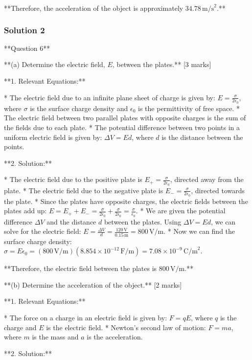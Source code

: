 \documentclass{article}
\begin{document}
**Therefore, the acceleration of the object is approximately $34.78 \, \text{m/s}^2$.**


\subsubsection{Solution 2}
**Question 6**

**(a) Determine the electric field, $E$, between the plates.** [3 marks]

**1. Relevant Equations:**

*   The electric field due to an infinite plane sheet of charge is given by:  $E = \frac{\sigma}{2\epsilon_0}$, where $\sigma$ is the surface charge density and $\epsilon_0$ is the permittivity of free space.
*   The electric field between two parallel plates with opposite charges is the sum of the fields due to each plate.
*   The potential difference between two points in a uniform electric field is given by: $\Delta V = Ed$, where $d$ is the distance between the points.

**2. Solution:**

*   The electric field due to the positive plate is $E_+ = \frac{\sigma}{2\epsilon_0}$, directed away from the plate.
*   The electric field due to the negative plate is $E_- = \frac{\sigma}{2\epsilon_0}$, directed towards the plate.
*   Since the plates have opposite charges, the electric fields between the plates add up: $E = E_+ + E_- = \frac{\sigma}{2\epsilon_0} + \frac{\sigma}{2\epsilon_0} = \frac{\sigma}{\epsilon_0}$.
*   We are given the potential difference $\Delta V$ and the distance $d$ between the plates.  Using $\Delta V = Ed$, we can solve for the electric field: 
    $E = \frac{\Delta V}{d} = \frac{120 \, \text{V}}{0.15 \, \text{m}} = 800 \, \text{V/m}$.
*   Now we can find the surface charge density: $\sigma = E \epsilon_0 = (800 \, \text{V/m})(8.854 \times 10^{-12} \, \text{F/m}) = 7.08 \times 10^{-9} \, \text{C/m}^2$.

**Therefore, the electric field between the plates is $800 \, \text{V/m}$.**

**(b) Determine the acceleration of the object.** [2 marks]

**1. Relevant Equations:**

*   The force on a charge in an electric field is given by: $F = qE$, where $q$ is the charge and $E$ is the electric field.
*   Newton's second law of motion: $F = ma$, where $m$ is the mass and $a$ is the acceleration.

**2. Solution:**
\end{document}
